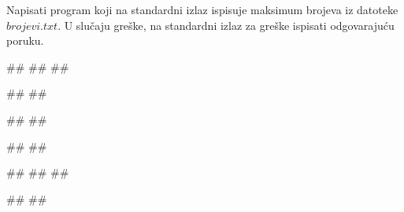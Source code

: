 \begin{Exercise}[label=p3_05] 
 Napisati program koji na standardni izlaz ispisuje maksimum brojeva iz datoteke $brojevi.txt$.
 U slučaju greške, na standardni izlaz za greške ispisati odgovarajuću poruku.

\begin{minitest}
\begin{upotreba}{1}
##
##
##

#\naslovIzlaz#
##
\end{upotreba}
\end{minitest}
\begin{minitest}
\begin{upotreba}{2}
##
##

#\naslovIzlaz#
##
\end{upotreba}
\end{minitest}
\begin{minitest}
\begin{upotreba}{3}
##
##
##

#\naslovIzlaz#
##
\end{upotreba}
\end{minitest}
\end{Exercise}
\begin{Answer}[ref=p3_05]
\end{Answer}


